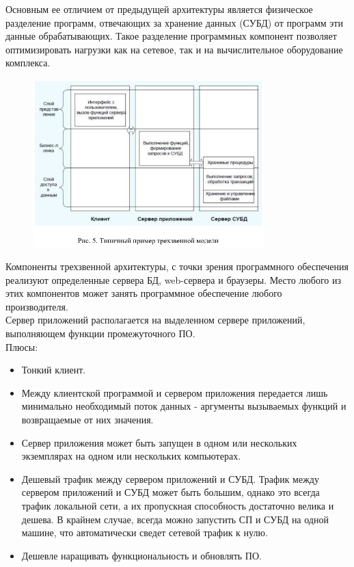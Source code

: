 Основным ее отличием от предыдущей архитектуры является физическое разделение
программ, отвечающих за хранение данных (СУБД) от программ эти данные
обрабатывающих. Такое разделение программных компонент позволяет оптимизировать
нагрузки как на сетевое, так и на вычислительное оборудование комплекса.~\\

\begin{figure}[h!]
    \centering
    \includegraphics[width=0.8\textwidth]{assets/665}
\end{figure}

Компоненты трехзвенной архитектуры, с точки зрения программного обеспечения
реализуют определенные сервера БД, web-сервера и браузеры. Место любого из этих
компонентов может занять программное обеспечение любого производителя.~\\

Сервер приложений располагается на выделенном сервере приложений, выполняющем функции промежуточного ПО.~\\

Плюсы:
\begin{itemize}
    \item Тонкий клиент.
    \item Между клиентской программой и сервером приложения передается лишь минимально необходимый поток данных - аргументы вызываемых функций и возвращаемые от них значения.
    \item Сервер приложения может быть запущен в одном или нескольких экземплярах на одном или нескольких компьютерах.
    \item Дешевый трафик между сервером приложений и СУБД. Трафик между сервером приложений и СУБД может быть большим, однако это всегда трафик локальной сети, а их пропускная способность достаточно велика и дешева. В крайнем случае, всегда можно запустить СП и СУБД на одной машине, что автоматически сведет сетевой трафик к нулю.
    \item Дешевле наращивать функциональность и обновлять ПО.
\end{itemize}

